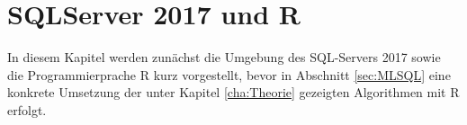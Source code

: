 \chapter{SQLServer 2017 und R}
\label{cha:SQLServer}
\label{cha:R}
In diesem Kapitel werden zunächst die Umgebung des SQL-Servers 2017 sowie die Programmierprache R kurz vorgestellt, bevor in Abschnitt \ref{sec:MLSQL} eine konkrete Umsetzung der unter Kapitel \ref{cha:Theorie} gezeigten Algorithmen mit R erfolgt.


